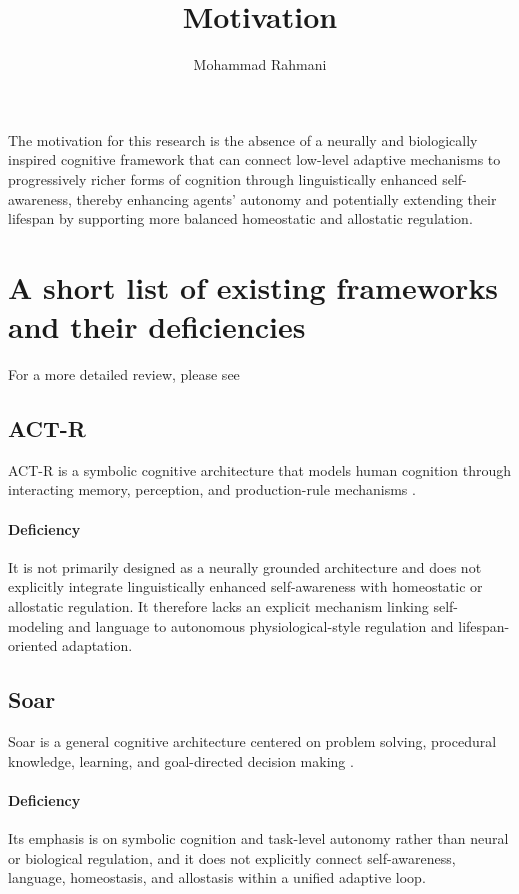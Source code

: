 \documentclass[a4paper]{article}
\title{Motivation}
\date{}
\author{Mohammad Rahmani}
\begin{document}
   \maketitle
   The motivation for this research is the absence of a neurally and biologically inspired cognitive framework that can connect low-level adaptive mechanisms to progressively richer forms of cognition through linguistically enhanced self-awareness, thereby enhancing agents' autonomy and potentially extending their lifespan by supporting more balanced homeostatic and allostatic regulation.


   \section{A short list of existing frameworks and their deficiencies}
   For a more detailed review, please see 
   
   
      \subsection{ACT-R}
      ACT-R is a symbolic cognitive architecture that models human cognition through interacting memory, perception, and production-rule mechanisms \cite{anderson-1996-act-r}.

      \paragraph{Deficiency}
      It is not primarily designed as a neurally grounded architecture and does not explicitly integrate linguistically enhanced self-awareness with homeostatic or allostatic regulation. It therefore lacks an explicit mechanism linking self-modeling and language to autonomous physiological-style regulation and lifespan-oriented adaptation.

      \subsection{Soar}
      Soar is a general cognitive architecture centered on problem solving, procedural knowledge, learning, and goal-directed decision making \cite{lehman-1996-soar-architecture}.

      \paragraph{Deficiency}
      Its emphasis is on symbolic cognition and task-level autonomy rather than neural or biological regulation, and it does not explicitly connect self-awareness, language, homeostasis, and allostasis within a unified adaptive loop.
\end{document}
